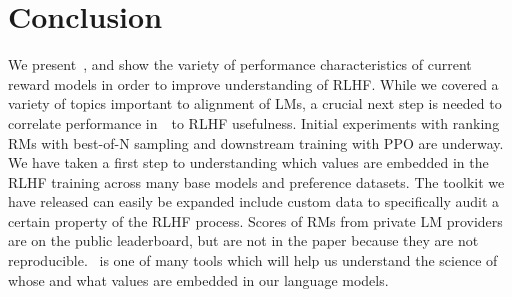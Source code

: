 \section{Conclusion}
We present~\name, and show the variety of performance characteristics of current reward models in order to improve understanding of RLHF.
While we covered a variety of topics important to alignment of LMs, a crucial next step is needed to correlate performance in~\name~to RLHF usefulness.
Initial experiments with ranking RMs with best-of-N sampling and downstream training with PPO are underway.
We have taken a first step to understanding which values are embedded in the RLHF training across many base models and preference datasets.
The toolkit we have released can easily be expanded include custom data to specifically audit a certain property of the RLHF process.
Scores of RMs from private LM providers are on the public leaderboard, but are not in the paper because they are not reproducible.
\name~is one of many tools which will help us understand the science of whose and what values are embedded in our language models.
